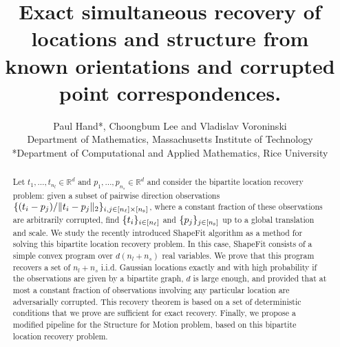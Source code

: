 \documentclass[11pt]{article}
\title{Exact simultaneous recovery of locations and structure from known orientations and corrupted point correspondences.}
\author{ Paul Hand*, Choongbum Lee and Vladislav Voroninski\\
  Department of Mathematics, Massachusetts Institute of Technology\\
  *Department of Computational and Applied Mathematics, Rice University
}
\begin{document}
\maketitle

\begin{abstract}
Let $t_1,\ldots,t_{n_l} \in \mathbb{R}^d$ and $p_1,\ldots,p_{n_s} \in \mathbb{R}^d$ and consider the bipartite location recovery problem: given a subset of pairwise direction observations $\{(t_i - p_j) / \|t_i - p_j\|_2\}_{i,j \in [n_\ell] \times [n_\text{s}]}$, where a constant fraction of these observations are arbitrarily corrupted, find $\{t_i\}_{i \in [n_\ell]}$ and $\{p_j\}_{j \in [n_\text{s}]}$ up to a global translation and scale. We study the recently introduced ShapeFit algorithm as a method for solving this bipartite location recovery problem.  In this case, ShapeFit consists of a simple convex program over $d(n_l + n_s)$ real variables. We prove that this program recovers a set of $n_l+n_s$ i.i.d. Gaussian locations exactly and with high probability if the observations are given by a bipartite \erdosrenyi graph, $d$ is large enough, and provided that at most a constant fraction of observations involving any particular location are adversarially corrupted. This recovery theorem is based on a set of deterministic conditions that we prove are sufficient for exact recovery. Finally, we propose a modified pipeline for the Structure for Motion problem, based on this bipartite location recovery problem. 

\end{abstract}

%



\end{document}
